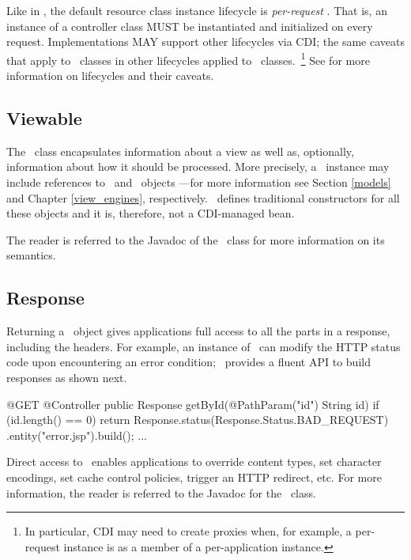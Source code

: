 Like in \jaxrs, the default resource class instance lifecycle is {\em per-request}
.
That is, an instance of a controller class MUST be instantiated and initialized 
on every request. Implementations MAY support other lifecycles via CDI; the same caveats 
that apply to \jaxrs\ classes in other lifecycles applied to \mvc\ classes.~\footnote{In particular, 
CDI may need to create proxies when, for example, a per-request instance is as a member of a 
per-application instance.} See \cite{jaxrs} for more information on lifecycles and 
their caveats.

\subsection{Viewable}
\label{viewable}

The \Viewable\ class encapsulates information about a view as well as, optionally, 
information about how it  should be processed. More precisely, a \Viewable\ instance 
may include references to \Models\ and \ViewEngine\ objects ---for more information 
see Section \ref{models} and Chapter \ref{view_engines}, respectively. 
\Viewable\ defines traditional constructors for all these objects and it is, therefore, 
not a CDI-managed bean.

The reader is referred to the Javadoc of the \Viewable\ class for more information on its semantics.

\subsection{Response}
\label{response}

Returning a \Response\ object gives applications full access to all the parts in a response, 
including the headers. For example, an instance of  \Response\ can modify the HTTP status
code upon encountering an error condition; \jaxrs\ provides a fluent API to build responses
as shown next.

\begin{listing}{1}
@GET
@Controller
public Response getById(@PathParam("id") String id) {
    if (id.length() == 0) {
   	    return Response.status(Response.Status.BAD_REQUEST)
   	                   .entity("error.jsp").build();
    } 
    ...
}
\end{listing}

Direct access to \Response\ enables applications to override content types, set character
encodings, set cache control policies, trigger an HTTP redirect, etc. For more information, 
the reader is referred to the Javadoc for the \Response\ class.

